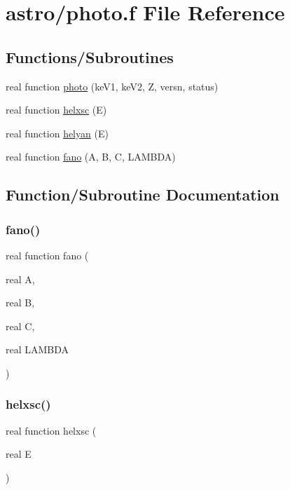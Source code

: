 \hypertarget{photo_8f}{}\section{astro/photo.f File Reference}
\label{photo_8f}
\subsection*{Functions/\+Subroutines}
\begin{DoxyCompactItemize}
\item 
real function \hyperlink{photo_8f_ab440cd63271f928e41157ffa5b941e90}{photo} (ke\+V1, ke\+V2, Z, versn, status)
\item 
real function \hyperlink{photo_8f_a3331ea376780eb48ef6ea6a7df352ec8}{helxsc} (E)
\item 
real function \hyperlink{photo_8f_a897128d74da5e00797220720c7ba3a42}{helyan} (E)
\item 
real function \hyperlink{photo_8f_ac5484a9e1b3a2feb068470838cf7baa5}{fano} (A, B, C, L\+A\+M\+B\+DA)
\end{DoxyCompactItemize}


\subsection{Function/\+Subroutine Documentation}
\mbox{\label{photo_8f_ac5484a9e1b3a2feb068470838cf7baa5}} 
\subsubsection{\texorpdfstring{fano()}{fano()}}
{\footnotesize\ttfamily real function fano (\begin{DoxyParamCaption}\item[{real}]{A,  }\item[{real}]{B,  }\item[{real}]{C,  }\item[{real}]{L\+A\+M\+B\+DA }\end{DoxyParamCaption})}

\mbox{\label{photo_8f_a3331ea376780eb48ef6ea6a7df352ec8}} 
\subsubsection{\texorpdfstring{helxsc()}{helxsc()}}
{\footnotesize\ttfamily real function helxsc (\begin{DoxyParamCaption}\item[{real}]{E }\end{DoxyParamCaption})}


